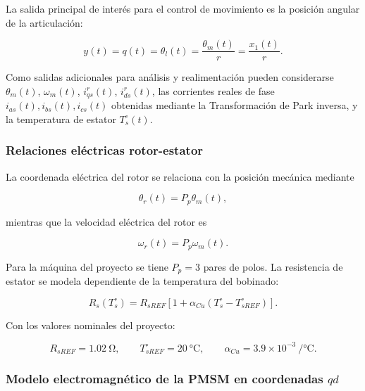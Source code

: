 \documentclass[10pt,a4paper]{article}
\begin{document}
La salida principal de interés para el control de movimiento es la posición angular de la articulación:

\begin{equation}
    y(t)=q(t)=\theta_l(t)=\frac{\theta_m(t)}{r}=\frac{x_1(t)}{r}.
    \label{eq:salida_principal_q}
\end{equation}

Como salidas adicionales para análisis y realimentación pueden considerarse \(\theta_m(t)\), \(\omega_m(t)\), \(i_{qs}^{r}(t)\), \(i_{ds}^{r}(t)\), las corrientes reales de fase \(i_{as}(t), i_{bs}(t), i_{cs}(t)\) obtenidas mediante la Transformación de Park inversa, y la temperatura de estator \(T_s^{\circ}(t)\).

\subsubsection{Relaciones eléctricas rotor-estator}

La coordenada eléctrica del rotor se relaciona con la posición mecánica mediante

\begin{equation}
    \theta_r(t)=P_p\theta_m(t),
    \label{eq:theta_r}
\end{equation}

mientras que la velocidad eléctrica del rotor es

\begin{equation}
    \omega_r(t)=P_p\omega_m(t).
    \label{eq:omega_r}
\end{equation}

Para la máquina del proyecto se tiene \(P_p=3\) pares de polos. La resistencia de estator se modela dependiente de la temperatura del bobinado:

\begin{equation}
    R_s\left(T_s^{\circ}\right)
    =
    R_{sREF}
    \left[
    1+\alpha_{Cu}\left(T_s^{\circ}-T_{sREF}^{\circ}\right)
    \right].
    \label{eq:rs_temperatura}
\end{equation}

Con los valores nominales del proyecto:

\begin{equation}
    R_{sREF}=\SI{1.02}{\ohm},
    \qquad
    T_{sREF}^{\circ}=\SI{20}{\celsius},
    \qquad
    \alpha_{Cu}=3.9\times10^{-3}\ \si{\per\celsius}.
\end{equation}

\subsubsection{Modelo electromagnético de la PMSM en coordenadas \(qd\)}
\end{document}

